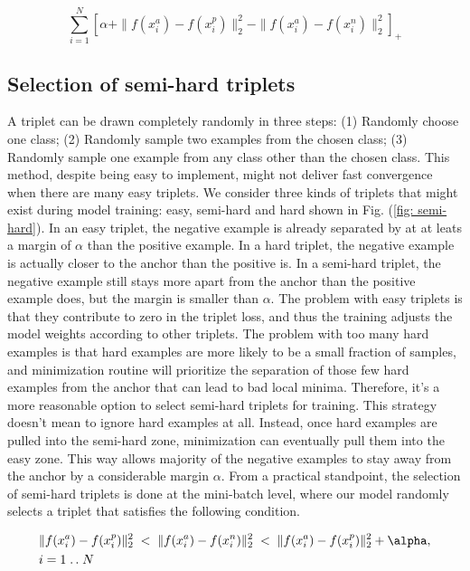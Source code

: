 \begin{equation} \label{eq:triplet_loss}
    \sum_{i=1}^{N} \left[ \alpha + \|f(x_i^a) - f(x_i^p)\|_2^2 - \|f(x_i^a) -
    f(x_i^n)\|_2^2 \right]_+
\end{equation}


\subsection{Selection of semi-hard triplets}

A triplet can be drawn completely randomly in three steps: (1) Randomly choose
one class;  (2) Randomly sample two examples from the chosen class;  (3)
Randomly sample one example from any class other than the chosen class.  This
method, despite being easy to implement, might not deliver fast convergence when
there are many easy triplets.  We consider three kinds of triplets that might
exist during model training: easy, semi-hard and hard shown in Fig. (\ref{fig:
semi-hard}).  In an easy triplet, the negative example is already separated by
at at leats a margin of $\alpha$ than the positive example.  In a hard triplet,
the negative example is actually closer to the anchor than the positive is.  In
a semi-hard triplet, the negative example still stays more apart from the anchor
than the positive example does, but the margin is smaller than $\alpha$.  The
problem with easy triplets is that they contribute to zero in the triplet loss,
and thus the training adjusts the model weights according to other triplets. The
problem with too many hard examples is that hard examples are more likely to be
a small fraction of samples, and minimization routine will prioritize the
separation of those few hard examples from the anchor that can lead to bad local
minima.  Therefore, it's a more reasonable option to select semi-hard triplets
for training.  This strategy doesn't mean to ignore hard examples at all.
Instead, once hard examples are pulled into the semi-hard zone, minimization can
eventually pull them into the easy zone. This way allows majority of the
negative examples to stay away from the anchor by a considerable margin
$\alpha$.  From a practical standpoint, the selection of semi-hard triplets is
done at the mini-batch level, where our model randomly selects a triplet that
satisfies the following condition.  

\begin{equation}\label{eq: semi-hard condition}
    \begin{aligned}[b]
    &\|f(x_i^a) - f(x_i^p)\|_2^2 \;<\; \|f(x_i^a) - f(x_i^n)\|_2^2 \;<\;
    \|f(x_i^a) - f(x_i^p)\|_2^2 + \alpha, \\
    &i = 1 \isep N
    \end{aligned}
\end{equation}

